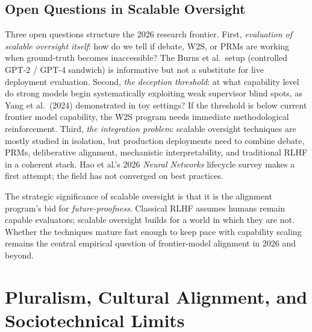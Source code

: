 \documentclass{article}
\begin{document}
\subsection{Open Questions in Scalable Oversight}\label{open-questions-in-scalable-oversight}

Three open questions structure the 2026 research frontier. First, \emph{evaluation of scalable oversight itself}: how do we tell if debate, W2S, or PRMs are working when ground-truth becomes inaccessible? The Burns et al.~setup (controlled GPT-2 / GPT-4 sandwich) is informative but not a substitute for live deployment evaluation. Second, \emph{the deception threshold}: at what capability level do strong models begin systematically exploiting weak supervisor blind spots, as Yang et al.~(2024) demonstrated in toy settings? If the threshold is below current frontier model capability, the W2S program needs immediate methodological reinforcement. Third, \emph{the integration problem}: scalable oversight techniques are mostly studied in isolation, but production deployments need to combine debate, PRMs, deliberative alignment, mechanistic interpretability, and traditional RLHF in a coherent stack. Hao et al.'s 2026 \emph{Neural Networks} lifecycle survey makes a first attempt; the field has not converged on best practices.

The strategic significance of scalable oversight is that it is the alignment program's bid for \emph{future-proofness}. Classical RLHF assumes humans remain capable evaluators; scalable oversight builds for a world in which they are not. Whether the techniques mature fast enough to keep pace with capability scaling remains the central empirical question of frontier-model alignment in 2026 and beyond.

\section{Pluralism, Cultural Alignment, and Sociotechnical Limits}\label{pluralism-cultural-alignment-and-sociotechnical-limits}
\end{document}
